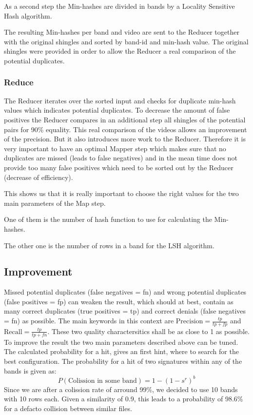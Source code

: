 \documentclass[a4paper, 11pt]{article}
\begin{document}
As a second step the Min-hashes are divided in bands by a Locality Sensitive Hash algorithm.

The resulting Min-hashes per band and video are sent to the Reducer together with the original shingles and sorted by band-id and min-hash value. The original shingles were provided in order to allow the Reducer a real comparison of the potential duplicates.

\subsubsection{Reduce}

The Reducer iterates over the sorted input and checks for duplicate min-hash values which indicates potential duplicates. To decrease the amount of false positives the Reducer compares in an additional step all shingles of the potential pairs for 90\% equality. This real comparison of the videos allows an improvement of the precision. But it also introduces more work to the Reducer. 
Therefore it is very important to have an optimal Mapper step which makes sure that no duplicates are missed (leads to false negatives) and in the mean time does not provide too many false positives which need to be sorted out by the Reducer (decrease of efficiency).

This shows us that it is really important to choose the right values for the two main parameters of the Map step.

One of them is the number of hash function to use for calculating the Min-hashes.

The other one is the number of rows in a band for the LSH algorithm.


\subsection{Improvement}

Missed potential duplicates (false negatives = fn) and wrong potential duplicates (false positives = fp) can weaken the result, which should at best, contain as many correct duplicates (true positives = tp) and correct denials (false negatives  = fn) as possible. The main keywords in this context are $\text{Precision}=\frac{tp}{tp+fp}$ and $\text{Recall}=\frac{tp}{tp+fn}$. These two quality charactersitics shall be as close to 1 as possible.
To improve the result the two main parameters described above can be tuned.
The calculated probability for a hit, gives an first hint, where to search for the best configuration. The 
probability for a hit of two signatures within any of the bands is given as:
\begin{equation*}P(\text{Colission in some band}) = 1 - (1-s^r)^b \end{equation*}
Since we are after a colission rate of arround 99\%,  we decided to use 10 bands with 10 rows each. Given a similarity of 0.9, this leads to a probability of 98.6\% for a defacto collision between similar files.  
\end{document}
